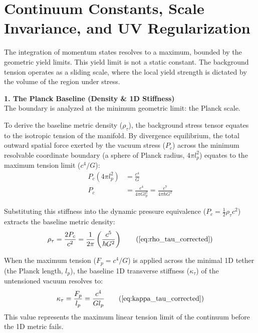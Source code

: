 \section{Continuum Constants, Scale Invariance, and UV Regularization}
\label{sec:deriv_continuum_constants}

The integration of momentum states resolves to a maximum, bounded by the geometric yield limits. This yield limit is not a static constant. The background tension operates as a sliding scale, where the local yield strength is dictated by the volume of the region under stress.

\vspace{0.2 cm}

\textbf{1. The Planck Baseline (Density \& 1D Stiffness)}\\
The boundary is analyzed at the minimum geometric limit: the Planck scale. 

To derive the baseline metric density ($\rho_\tau$), the background stress tensor equates to the isotropic tension of the manifold. By divergence equilibrium, the total outward spatial force exerted by the vacuum stress ($P_c$) across the minimum resolvable coordinate boundary (a sphere of Planck radius, $4\pi l_p^2$) equates to the maximum tension limit ($c^4/G$): 
\begin{align}
    P_c (4\pi l_p^2) &= \frac{c^4}{G} \nonumber \\
    P_c &= \frac{c^4}{4\pi G l_p^2} = \frac{c^7}{4\pi \hbar G^2}
\end{align}

Substituting this stiffness into the dynamic pressure equivalence ($P_c = \frac{1}{2}\rho_\tau c^2$) extracts the baseline metric density:
\begin{equation}
    \rho_\tau = \frac{2 P_c}{c^2} = \frac{1}{2\pi} \left( \frac{c^5}{\hbar G^2} \right) \tag{\ref{eq:rho_tau_corrected}}
\end{equation}

When the maximum tension ($F_p = c^4/G$) is applied across the minimal 1D tether (the Planck length, $l_p$), the baseline 1D transverse stiffness ($\kappa_\tau$) of the untensioned vacuum resolves to:
\begin{equation}
    \kappa_\tau = \frac{F_p}{l_p} = \frac{c^4}{G l_p} \tag{\ref{eq:kappa_tau_corrected}}
\end{equation}
This value represents the maximum linear tension limit of the continuum before the 1D metric fails.

\vspace{0.2 cm}


